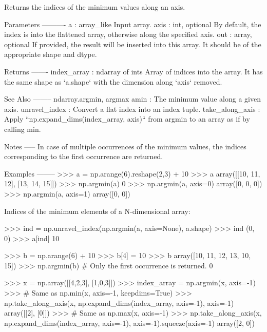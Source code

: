 \begin{DoxyVerb}Returns the indices of the minimum values along an axis.

Parameters
----------
a : array_like
    Input array.
axis : int, optional
    By default, the index is into the flattened array, otherwise
    along the specified axis.
out : array, optional
    If provided, the result will be inserted into this array. It should
    be of the appropriate shape and dtype.

Returns
-------
index_array : ndarray of ints
    Array of indices into the array. It has the same shape as `a.shape`
    with the dimension along `axis` removed.

See Also
--------
ndarray.argmin, argmax
amin : The minimum value along a given axis.
unravel_index : Convert a flat index into an index tuple.
take_along_axis : Apply ``np.expand_dims(index_array, axis)``
                  from argmin to an array as if by calling min.

Notes
-----
In case of multiple occurrences of the minimum values, the indices
corresponding to the first occurrence are returned.

Examples
--------
>>> a = np.arange(6).reshape(2,3) + 10
>>> a
array([[10, 11, 12],
       [13, 14, 15]])
>>> np.argmin(a)
0
>>> np.argmin(a, axis=0)
array([0, 0, 0])
>>> np.argmin(a, axis=1)
array([0, 0])

Indices of the minimum elements of a N-dimensional array:

>>> ind = np.unravel_index(np.argmin(a, axis=None), a.shape)
>>> ind
(0, 0)
>>> a[ind]
10

>>> b = np.arange(6) + 10
>>> b[4] = 10
>>> b
array([10, 11, 12, 13, 10, 15])
>>> np.argmin(b)  # Only the first occurrence is returned.
0

>>> x = np.array([[4,2,3], [1,0,3]])
>>> index_array = np.argmin(x, axis=-1)
>>> # Same as np.min(x, axis=-1, keepdims=True)
>>> np.take_along_axis(x, np.expand_dims(index_array, axis=-1), axis=-1)
array([[2],
       [0]])
>>> # Same as np.max(x, axis=-1)
>>> np.take_along_axis(x, np.expand_dims(index_array, axis=-1), axis=-1).squeeze(axis=-1)
array([2, 0])\end{DoxyVerb}
 \mbox{\label{namespacenumpy_1_1core_1_1fromnumeric_ab2949c8fff4adc05f8845f9954146cfe}} 
